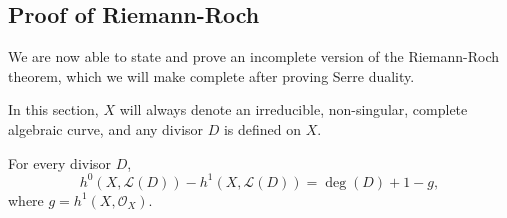 \documentclass[12pt]{article}
\begin{document}
\subsection{Proof of Riemann-Roch}
We are now able to state and prove an incomplete version of the Riemann-Roch
theorem, which we will make complete after proving Serre duality.

\begin{lnote}
  In this section, $X$ will always denote an irreducible, non-singular,
  complete algebraic curve, and any divisor $D$ is defined on $X$.
\end{lnote}

\begin{thm}
  \label{thm:riemann_roch_incomplete}
  For every divisor $D$,
  \[
    h^{0}(X, \mathcal{L}(D))-h^{1}(X, \mathcal{L}(D))=\deg(D)+1-g,
  \]
  where $g=h^{1}(X, \mathcal{O}_{X})$.
\end{thm}
\end{document}

